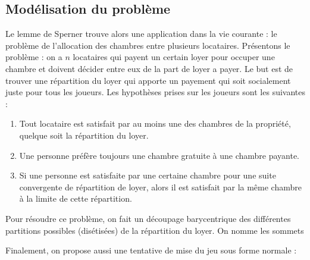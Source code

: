 \documentclass[12pt,twoside,a4paper]{article}
\begin{document}
\subsection{Mod\'elisation du probl\`eme}

Le lemme de Sperner trouve alors une application dans la vie courante : le probl\`eme de l'allocation des chambres entre plusieurs locataires. Pr\'esentons le probl\`eme : on a $n$ locataires qui payent un certain loyer pour occuper une chambre et doivent d\'ecider entre eux de la part de loyer \? a payer. Le but est de trouver une r\'epartition du loyer qui apporte un payement qui soit socialement juste pour tous les joueurs.
Les hypothèses prises sur les joueurs sont les suivantes :
\begin{enumerate}
	\item Tout locataire est satisfait par au moins une des chambres de la propri\'et\'e, quelque soit la r\'epartition du loyer.
	\item Une personne pr\'ef\`ere toujours une chambre gratuite \`a une chambre payante.
	\item Si une personne est satisfaite par une certaine chambre pour une suite convergente de r\'epartition de loyer, alors il est satisfait par la m\^{e}me chambre \`a la limite de cette r\'epartition.
\end{enumerate}
Pour r\'esoudre ce probl\`eme, on fait un découpage barycentrique des diff\'erentes partitions possibles (dis\'etis\'ees) de la r\'epartition du loyer. On nomme les sommets %

Finalement, on propose aussi une tentative de mise du jeu sous forme normale :
\end{document}
